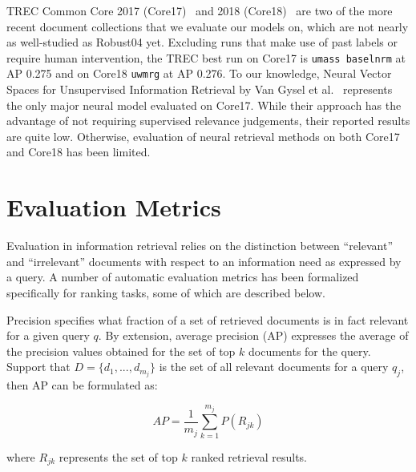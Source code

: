 TREC Common Core 2017 (Core17)~\cite{allan2017trec} and 2018 (Core18)~\cite{core2018trec} are two of the more recent document collections that we evaluate our models on, which are not nearly as well-studied as Robust04 yet.
Excluding runs that make use of past labels or require human intervention, the TREC best run on Core17 is \texttt{umass baselnrm} at AP 0.275 and on Core18 \texttt{uwmrg} at AP 0.276.
To our knowledge, Neural Vector Spaces for Unsupervised Information Retrieval by Van Gysel et al.~\cite{Gysel:2018:NVS:3211967.3196826} represents the only major neural model evaluated on Core17.
While their approach has the advantage of not requiring supervised relevance judgements, their reported results are quite low.
Otherwise, evaluation of neural retrieval methods on both Core17 and Core18 has been limited.

\section{Evaluation Metrics}

Evaluation in information retrieval relies on the distinction between ``relevant'' and ``irrelevant'' documents with respect to an information need as expressed by a query.
A number of automatic evaluation metrics has been formalized specifically for ranking tasks, some of which are described below.


\smallskip {}

Precision specifies what fraction of a set of retrieved documents is in fact relevant for a given query $ q $.
By extension, average precision (AP) expresses the average of the precision values obtained for the set of top $ k $ documents for the query.
Support that $ D = \{d_1, ..., d_{m_j}\} $ is the set of all relevant documents for a query $ q_j $, then AP can be formulated as:

\begin{equation}
AP = \frac{1}{m_j} \sum^{m_j} _{k = 1} P(R_{jk})
\end{equation}

\noindent where $ R_{jk} $ represents the set of top $ k $ ranked retrieval results.

